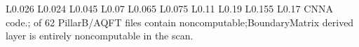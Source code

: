 \begin{longtable}{L{0.026\linewidth} L{0.024\linewidth} L{0.045\linewidth} L{0.07\linewidth} L{0.065\linewidth} L{0.075\linewidth} L{0.11\linewidth} L{0.19\linewidth} L{0.155\linewidth} L{0.17\linewidth}}
CNNA code.; of 62 PillarB/\allowbreak{}AQFT files contain noncomputable;\newline BoundaryMatrix derived layer is entirely noncomputable in the scan.\\
\hline
\addlinespace[0.24em]
\end{longtable}
\normalsize
